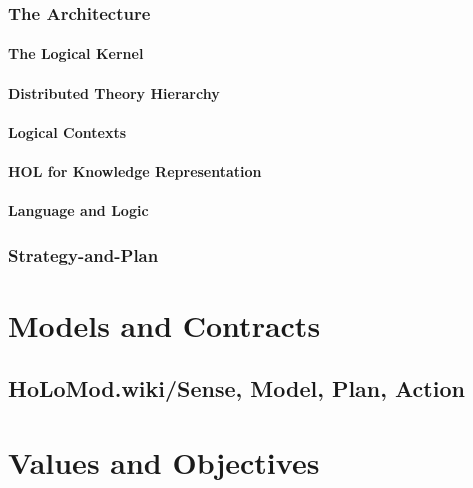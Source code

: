\documentclass[10pt,titlepage]{book}
\begin{document}
\section{The Architecture}\label{the-architecture}

\subsection{The Logical Kernel}\label{the-logical-kernel}

\subsection{Distributed Theory Hierarchy}\label{distributed-theory-hierarchy}

\subsection{Logical Contexts}\label{logical-contexts}

\subsection{HOL for Knowledge Representation}\label{hol-for-knowledge-representation}

\subsection{Language and Logic}\label{language-and-logic}

\section{Strategy-and-Plan}\label{strategy-and-plan}


\part{Models and Contracts}\label{models-and-contracts}

\chapter{HoLoMod.wiki/Sense, Model, Plan, Action}\label{}


\part{Values and Objectives}\label{values-and-objectives}
\end{document}
